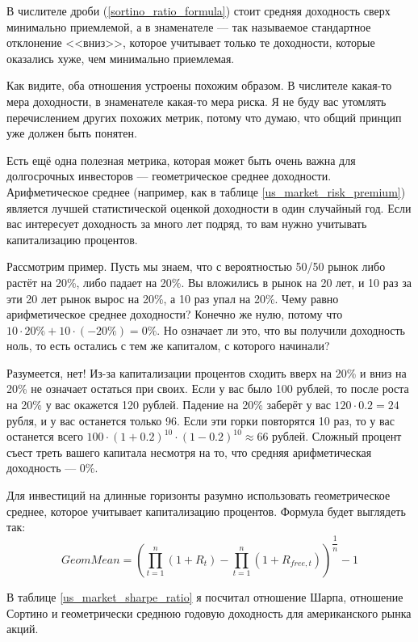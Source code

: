 В числителе дроби (\ref{sortino_ratio_formula}) стоит средняя доходность сверх 
минимально приемлемой, а в знаменателе --- так называемое стандартное отклонение 
<<вниз>>, которое учитывает только те доходности, которые оказались хуже, чем 
минимально приемлемая.

Как видите, оба отношения устроены похожим образом. В числителе какая-то мера 
доходности, в знаменателе какая-то мера риска. Я не буду вас утомлять
перечислением других похожих метрик, потому что думаю, что общий принцип уже
должен быть понятен.

Есть ещё одна полезная метрика, которая может быть очень важна для долгосрочных 
инвесторов --- геометрическое среднее доходности. Арифметическое среднее 
(например, как в таблице \ref{us_market_risk_premium}) является лучшей 
статистической оценкой доходности в один случайный год. Если вас интересует 
доходность за много лет подряд, то вам нужно учитывать капитализацию процентов.

Рассмотрим пример. Пусть мы знаем, что с вероятностью 50/50 рынок либо растёт на 
20\%, либо падает на 20\%. Вы вложились в рынок на 20 лет, и 10 раз за эти 20 
лет рынок вырос на 20\%, а 10 раз упал на 20\%. Чему равно арифметическое 
среднее доходности? Конечно же нулю, потому что $10 \cdot 20\% + 10 \cdot
(-20\%) = 0\%$. Но означает ли это, что вы получили доходность ноль, то есть 
остались с тем же капиталом, с которого начинали?

Разумеется, нет! Из-за капитализации процентов сходить вверх на 20\% и вниз на 
20\% не означает остаться при своих. Если у вас было 100 рублей, то после роста 
на 20\% у вас окажется 120 рублей. Падение на 20\% заберёт у вас $120 \cdot 0.2 
= 24$ рубля, и у вас останется только 96. Если эти горки повторятся 10 раз, то 
у вас останется всего $100 \cdot (1 + 0.2)^{10} \cdot (1 - 0.2)^{10} \approx 66$ 
рублей. Сложный процент съест треть вашего капитала несмотря на то, что средняя 
арифметическая доходность --- 0\%.

Для инвестиций на длинные горизонты разумно использовать геометрическое среднее, 
которое учитывает капитализацию процентов. Формула будет выглядеть так:
\begin{equation*}
GeomMean = \left(
    \prod\limits_{t=1}^{n}(1 + R_t) -
    \prod\limits_{t=1}^{n}(1 + R_{free,t})
\right) ^ {\dfrac{1}{n}} - 1
\end{equation*}

В таблице  \ref{us_market_sharpe_ratio} я посчитал отношение Шарпа, отношение 
Сортино и геометрически среднюю годовую доходность для американского рынка 
акций.


